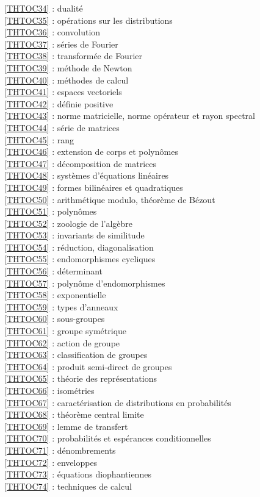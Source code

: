 \ref {THTOC34} : dualité\\
\ref {THTOC35} : opérations sur les distributions\\
\ref {THTOC36} : convolution\\
\ref {THTOC37} : séries de Fourier\\
\ref {THTOC38} : transformée de Fourier\\
\ref {THTOC39} : méthode de Newton\\
\ref {THTOC40} : méthodes de calcul\\
\ref {THTOC41} : espaces vectoriels\\
\ref {THTOC42} : définie positive\\
\ref {THTOC43} : norme matricielle, norme opérateur et rayon spectral\\
\ref {THTOC44} : série de matrices\\
\ref {THTOC45} : rang\\
\ref {THTOC46} : extension de corps et polynômes\\
\ref {THTOC47} : décomposition de matrices\\
\ref {THTOC48} : systèmes d'équations linéaires\\
\ref {THTOC49} : formes bilinéaires et quadratiques\\
\ref {THTOC50} : arithmétique modulo, théorème de Bézout\\
\ref {THTOC51} : polynômes\\
\ref {THTOC52} : zoologie de l'algèbre\\
\ref {THTOC53} : invariants de similitude\\
\ref {THTOC54} : réduction, diagonalisation\\
\ref {THTOC55} : endomorphismes cycliques\\
\ref {THTOC56} : déterminant\\
\ref {THTOC57} : polynôme d'endomorphismes\\
\ref {THTOC58} : exponentielle\\
\ref {THTOC59} : types d'anneaux\\
\ref {THTOC60} : sous-groupes\\
\ref {THTOC61} : groupe symétrique\\
\ref {THTOC62} : action de groupe\\
\ref {THTOC63} : classification de groupes\\
\ref {THTOC64} : produit semi-direct de groupes\\
\ref {THTOC65} : théorie des représentations\\
\ref {THTOC66} : isométries\\
\ref {THTOC67} : caractérisation de distributions en probabilités\\
\ref {THTOC68} : théorème central limite\\
\ref {THTOC69} : lemme de transfert\\
\ref {THTOC70} : probabilités et espérances conditionnelles\\
\ref {THTOC71} : dénombrements\\
\ref {THTOC72} : enveloppes\\
\ref {THTOC73} : équations diophantiennes\\
\ref {THTOC74} : techniques de calcul\\
